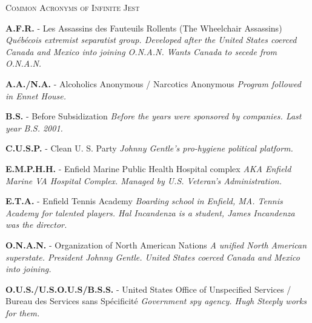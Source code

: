 \documentclass{article}
\begin{document}
\newpage
\begin{tcolorbox}[height=25.5cm]
\centering
\huge\textsc{Common Acronyms of Infinite Jest}
\small
\vspace{0.2cm}
\decorule
\vspace{0.2cm}
\begin{flushleft}
\textbf{A.F.R.} - Les Assassins des Fauteuils Rollents (The Wheelchair Assassins)
\vspace{0.1cm}
\newline
\emph{Qu\'{e}b\'{e}cois extremist separatist group. Developed after the United States coerced Canada and Mexico into joining O.N.A.N. Wants Canada to secede from O.N.A.N.}
\newline

\textbf{A.A./N.A.} - Alcoholics Anonymous / Narcotics Anonymous
\vspace{0.1cm}
\newline
\emph{Program followed in Ennet House. }
\newline

\textbf{B.S.} - Before Subsidization
\vspace{0.1cm}
\newline
\emph{Before the years were sponsored by companies. Last year B.S. 2001.}
\newline

\textbf{C.U.S.P.}  - Clean U. S. Party
\vspace{0.1cm}
\newline
\emph{Johnny Gentle's pro-hygiene political platform.}
\newline

\textbf{E.M.P.H.H.} - Enfield Marine Public Health Hospital complex
\vspace{0.1cm}
\newline
\emph{AKA Enfield Marine VA Hospital Complex. Managed by U.S. Veteran's Administration.}
\newline

\textbf{E.T.A.} - Enfield Tennis Academy
\vspace{0.1cm}
\newline
\emph{Boarding school in Enfield, MA. Tennis Academy for talented players. Hal Incandenza is a student, James Incandenza was the director.}
\newline

\textbf{O.N.A.N.} - Organization of North American Nations
\vspace{0.1cm}
\newline
\emph{A unified North American superstate. President Johnny Gentle. United States coerced Canada and Mexico into joining.}
\newline

\textbf{O.U.S./U.S.O.U.S/B.S.S.} - United States Office of Unspecified Services / Bureau des Services sans Sp\'{e}cificit\'{e} 
\vspace{0.1cm}
\newline
\emph{Government spy agency. Hugh Steeply works for them.}
\newline




\end{flushleft}
\end{tcolorbox}
\end{document}
